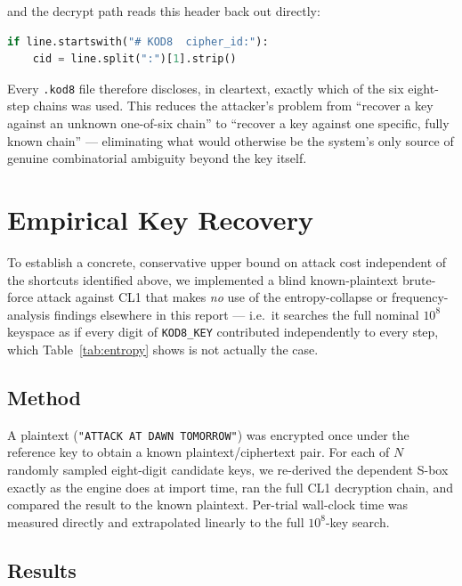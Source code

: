 \documentclass[11pt]{article}
\begin{document}
and the decrypt path reads this header back out directly:

\begin{lstlisting}[language=Python]
if line.startswith("# KOD8  cipher_id:"):
    cid = line.split(":")[1].strip()
\end{lstlisting}

Every \texttt{.kod8} file therefore discloses, in cleartext, exactly
which of the six eight-step chains was used. This reduces the
attacker's problem from ``recover a key against an unknown one-of-six
chain'' to ``recover a key against one specific, fully known chain'' ---
eliminating what would otherwise be the system's only source of
genuine combinatorial ambiguity beyond the key itself.

\section{Empirical Key Recovery}
\label{sec:brute}

To establish a concrete, conservative upper bound on attack cost
independent of the shortcuts identified above, we implemented a blind
known-plaintext brute-force attack against CL1 that makes \emph{no} use
of the entropy-collapse or frequency-analysis findings elsewhere in this
report --- i.e.\ it searches the full nominal $10^{8}$ keyspace as if
every digit of \texttt{KOD8\_KEY} contributed independently to every
step, which Table~\ref{tab:entropy} shows is not actually the case.

\subsection{Method}

A plaintext (\texttt{"ATTACK AT DAWN TOMORROW"}) was encrypted once
under the reference key to obtain a known plaintext/ciphertext pair.
For each of $N$ randomly sampled eight-digit candidate keys, we
re-derived the dependent S-box exactly as the engine does at import
time, ran the full CL1 decryption chain, and compared the result to the
known plaintext. Per-trial wall-clock time was measured directly and
extrapolated linearly to the full $10^{8}$-key search.

\subsection{Results}
\end{document}
